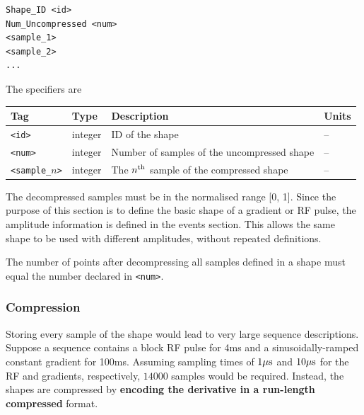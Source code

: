 \documentclass{article}
\begin{document}
\begin{lstlisting}
Shape_ID <id>
Num_Uncompressed <num>
<sample_1>
<sample_2>
...
\end{lstlisting}

The specifiers are

\begin{tabularx}{\textwidth}{llXl}
\toprule
Tag & Type & Description & Units\\
\midrule
\verb.<id>. & integer & ID of the shape & -- \\
\verb.<num>. & integer & Number of samples of the uncompressed shape & -- \\
\verb.<sample_.$n$\verb.>. & integer & The $n^{\rm th}$ sample of the compressed shape  & -- \\
\bottomrule
\end{tabularx}

The decompressed samples must be in the normalised range [0, 1]. Since the purpose of this section is to define the basic shape of a gradient or RF pulse, the amplitude information is defined in the events section. This allows the same shape to be used with different amplitudes, without repeated definitions.

The number of points after decompressing all samples defined in a shape must equal the number declared in \verb.<num>..

\subsubsection{Compression}

Storing every sample of the shape would lead to very large sequence descriptions. Suppose a sequence contains a block RF pulse for 4ms and a sinusoidally-ramped constant gradient for 100ms. Assuming sampling times of $1{\rm \mu s}$ and $10{\rm \mu s}$ for the RF and gradients, respectively, $14000$ samples would be required. Instead, the shapes are compressed by \textbf{encoding the derivative in a run-length compressed} format. 
\end{document}
